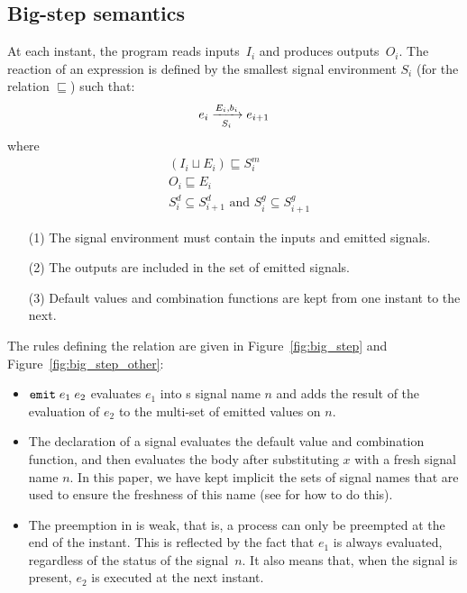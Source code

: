 \documentclass[9pt,preprint]{sigplanconf}
\begin{document}

\subsection{Big-step semantics}

At each instant, the program reads inputs~$I_i$ and produces outputs~$O_i$. The reaction of an expression is defined by the smallest signal environment $S_i$ (for the relation $\sqsubseteq$) such that:
\[ \bigstep{N}{e_i}{e_{i+1}}{E_i}{b_i}{S_i} \]
where
\begin{align}
& (I_i \sqcup E_i ) \sqsubseteq S_i^m \\
& O_i \sqsubseteq E_i \\
& S^d_i \subseteq S^d_{i+1} \text{ and } S^g_i \subseteq S^g_{i+1} 
\end{align}
\begin{itemize}
\item[(1)] The signal environment must contain the inputs and emitted signals.
\item[(2)] The outputs are included in the set of emitted signals.
\item[(3)] Default values and combination functions are kept from one instant to the next.
\end{itemize}

The rules defining the relation are given in Figure~\ref{fig:big_step} and Figure~\ref{fig:big_step_other}:
\begin{itemize}
\item $\eemit{e_1}{e_2}$ evaluates $e_1$ into s signal name $n$ and adds the result of the evaluation of $e_2$ to the multi-set of emitted values on $n$.
\item The declaration of a signal evaluates the default value and combination function, and then evaluates the body after substituting $x$ with a fresh signal name $n$. In this paper, we have kept implicit the sets of signal names that are used to ensure the freshness of this name (see \cite{Mandel:2005} for how to do this).
\item The preemption in \rml is weak, that is, a process can only be preempted at the end of the instant. This is reflected by the fact that $e_1$ is always evaluated, regardless of the status of the signal~$n$. It also means that, when the signal is present, $e_2$ is executed at the next instant.
\end{itemize}
\end{document}

